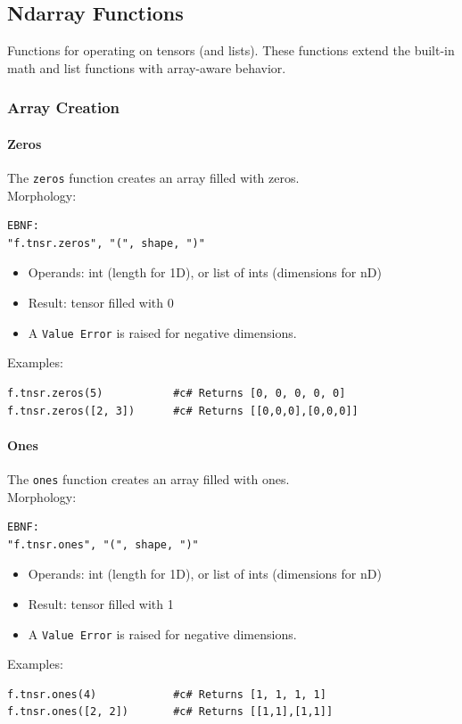 \subsection{Ndarray Functions}
Functions for operating on tensors (and lists). These functions extend the built-in math and list functions with array-aware behavior.

\subsubsection{Array Creation}

\paragraph{Zeros}
The \texttt{zeros} function creates an array filled with zeros.\\
Morphology:
\begin{verbatim}
EBNF:
"f.tnsr.zeros", "(", shape, ")"
\end{verbatim}
\begin{itemize}
\item Operands: int (length for 1D), or list of ints (dimensions for nD)
\item Result: tensor filled with 0
\item A \texttt{Value Error} is raised for negative dimensions.
\end{itemize}
Examples:
\begin{verbatim}
f.tnsr.zeros(5)           #c# Returns [0, 0, 0, 0, 0]
f.tnsr.zeros([2, 3])      #c# Returns [[0,0,0],[0,0,0]]
\end{verbatim}

\paragraph{Ones}
The \texttt{ones} function creates an array filled with ones.\\
Morphology:
\begin{verbatim}
EBNF:
"f.tnsr.ones", "(", shape, ")"
\end{verbatim}
\begin{itemize}
\item Operands: int (length for 1D), or list of ints (dimensions for nD)
\item Result: tensor filled with 1
\item A \texttt{Value Error} is raised for negative dimensions.
\end{itemize}
Examples:
\begin{verbatim}
f.tnsr.ones(4)            #c# Returns [1, 1, 1, 1]
f.tnsr.ones([2, 2])       #c# Returns [[1,1],[1,1]]
\end{verbatim}

